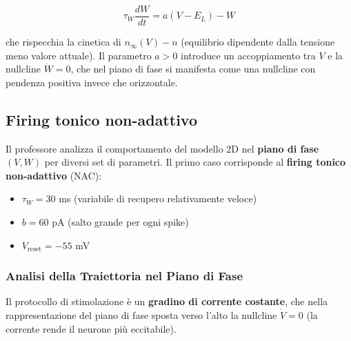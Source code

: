\begin{equation}
\tau_W \frac{dW}{dt} = a(V - E_L) - W
\end{equation}

che rispecchia la cinetica di $n_\infty(V) - n$ (equilibrio dipendente dalla tensione meno valore attuale). Il parametro $a > 0$ introduce un accoppiamento tra $V$ e la nullcline $\dot{W} = 0$, che nel piano di fase si manifesta come una nullcline con pendenza positiva invece che orizzontale.


\subsection{Firing tonico non-adattivo}

Il professore analizza il comportamento del modello 2D nel \textbf{piano di fase} $(V, W)$ per diversi set di parametri. Il primo caso corrisponde al \textbf{firing tonico non-adattivo} (NAC):

\begin{itemize}
    \item $\tau_W = 30$ ms (variabile di recupero relativamente veloce)
    \item $b = 60$ pA (salto grande per ogni spike)
    \item $V_{\text{reset}} = -55$ mV
\end{itemize}

\subsubsection{Analisi della Traiettoria nel Piano di Fase}

Il protocollo di stimolazione è un \textbf{gradino di corrente costante}, che nella rappresentazione del piano di fase sposta verso l'alto la nullcline $\dot{V} = 0$ (la corrente rende il neurone più eccitabile).

